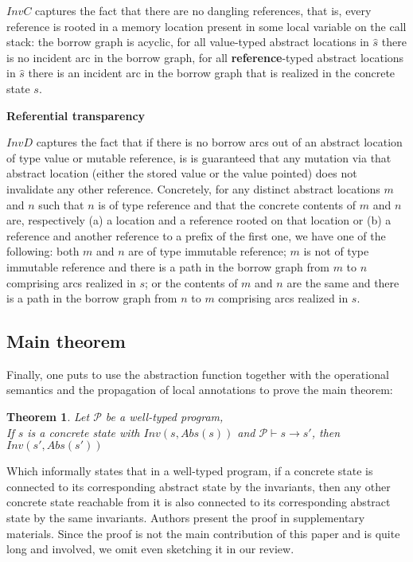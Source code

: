 $InvC$ captures the fact that there are no dangling references, that is, every reference is rooted in a memory location present in some local variable on the call stack: the borrow graph is acyclic, for all value-typed abstract locations in $\hat{s}$ there is no incident arc in the borrow graph, for all  \textbf{reference}-typed abstract locations in $\hat{s}$ there is an incident arc in the borrow graph that is realized in the concrete state $s$.

\noindent\textbf{Referential transparency}

$InvD$ captures the fact that if there is no borrow arcs out of an abstract location of type value or mutable reference, is is guaranteed that any mutation via that abstract location (either the stored value or the value pointed) does not invalidate any other reference. Concretely, for any distinct abstract locations $m$ and $n$ such that $n$ is of type reference and that the concrete contents of $m$ and $n$ are, respectively (a) a location and a reference rooted on that location or (b) a reference and another reference to a prefix of the first one, we have one of the following: both $m$ and $n$ are of type immutable reference; $m$ is not of type immutable reference and there is a path in the borrow graph from $m$ to $n$ comprising arcs realized in $s$; or the contents of $m$ and $n$ are the same and there is a path in the borrow graph from $n$ to $m$ comprising arcs realized in $s$.

\subsection{Main theorem}

Finally, one puts to use the abstraction function together with the operational semantics and the propagation of local annotations to prove the main theorem:

\newtheorem{theorem}{Theorem}

\begin{theorem}
    Let $\mathcal{P}$ be a well-typed program,\\
    If $s$ is a concrete state with $Inv(s, Abs(s))$ and $\mathcal{P} \vdash s \rightarrow s'$, then $Inv(s', Abs(s'))$
\end{theorem}
Which informally states that in a well-typed program, if a concrete state is connected to its corresponding abstract state by the invariants, then any other concrete state reachable from it is also connected to its corresponding abstract state by the same invariants. Authors present the proof in supplementary materials. Since the proof is not the main contribution of this paper and is quite long and involved, we omit even sketching it in our review.

